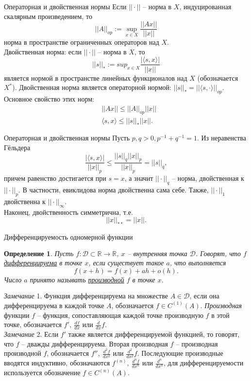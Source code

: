 \documentclass[10pt, handout]{beamer}
\newtheorem{definition_ru}{Определение}[]
\begin{document}
\begin{frame}{Операторная и двойственная нормы}
Если $||\cdot||$ -- норма в $X$, индуцированная скалярным произведением, то
$$
||A||_{op}:=\sup_{x\in X}\frac{||Ax||}{||x||}
$$
норма в пространстве ограниченных операторов над $X$.\\
\vspace{1em}
\pause
Двойственная норма: если $||\cdot||$ -- норма в $X$, то
$$
||s||_*:=sup_{x\in X}\frac{|\langle s, x\rangle|}{||x||}
$$
является нормой в пространстве линейных функционалов над $X$ (обозначается $X^*$). \pause Двойственная норма является операторной нормой: $||s||_*=||\langle s, \cdot\rangle||_{op}$. Основное свойство этих норм:
\begin{align*}
&||Ax||\leq ||A||_{op}||x|| \\
&\langle s, x\rangle\leq ||s||_*||x||.
\end{align*}
\end{frame}

\begin{frame}{Операторная и двойственная нормы}
Пусть $p, q>0, p^{-1}+q^{-1}=1$. Из неравенства Гёльдера
$$
\frac{|\langle s, x\rangle|}{||x||_p}\leq \frac{||s||_q||x||_p}{||x||_p}=||s||_q,
$$
причем равенство достигается при $s=x$, а значит $||\cdot||_q$ -- норма, двойственная к $||\cdot||_p$. В частности, евиклидова норма двойственна сама себе. Также, $||\cdot||_1$ двойственна к $||\cdot||_\infty$.\\
\vspace{1em}
\pause
Наконец, двойственность симметрична, т.е.
$$
||x||_{**}=||x||.
$$
\end{frame}

\begin{frame}{Дифференцируемость одномерной функции}
\begin{definition_ru}
Пусть $f:\mathcal{D}\subset\mathbb{R}\rightarrow \mathbb{R}$, $x$ -- внутренняя точка $\mathcal{D}$. Говорят, что $f$ \underline{дифференцируема} в точке $x$, если существует такое $a$, что выполняется 
$$
f(x+h)=f(x)+ah+o(h).
$$
Число $a$ принято называть \underline{производной} $f$ в точке $x$.
\end{definition_ru}
\pause
\textit{Замечание} 1. Функция дифференцируема на множестве $A\in \mathcal{D}$, если она дифференцируема в каждой точке $A$, обозначается $f\in C^{(1)}(A)$. \textit{Производная} функции $f$ -- функция, сопоставляющая каждой точке производную $f$ в этой точке, обозначается $f',~\frac{df}{dx}$ или $\frac{d}{dx}f$.\\
\pause
\textit{Замечание} 2. Если $f'$ также является дифференцируемой функцией, то говорят, что $f$ -- дважды дифференцируема. Вторая производная $f$ -- производная производной $f$, обозначается $f'',~ \frac{d^2f}{dx^2}$ или $\frac{d^2}{dx^2}f$. Последующие производные вводятся индуктивно, обозначаются $f^{(n)},~\frac{d^nf}{dx^n}$ или $\frac{d^n}{dx^n}$, для дифференцируемости используется обозначение $f\in C^{(n)}(A)$.

\end{frame}
\end{document}
